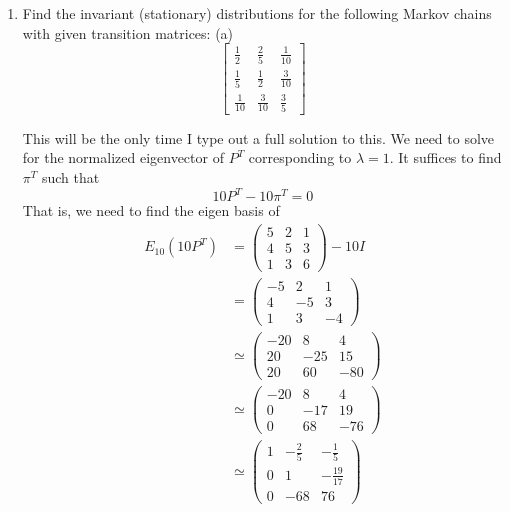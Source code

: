 \documentclass[10pt, oneside]{article}
\theoremstyle{definition}
\begin{document}
\begin{enumerate}
    \item Find the invariant (stationary) distributions for the following Markov chains with given transition matrices:
    (a)
    \[\begin{bmatrix}
        \frac{1}{2} & \frac{2}{5} & \frac{1}{10}\\
        \frac{1}{5} & \frac{1}{2} & \frac{3}{10}\\
        \frac{1}{10} & \frac{3}{10} & \frac{3}{5}
    \end{bmatrix}\]
    \begin{solution}
        This will be the only time I type out a full solution to this. 
        We need to solve for the normalized eigenvector of $P^T$ corresponding to $\lambda = 1.$ It suffices to find $\pi^T$ such that 
        \[10 P^T - 10\pi^T = 0\] That is, we need to find the eigen basis of
        \begin{align*}
            E_{10}(10P^T) &= 
            \begin{pmatrix}
            5 & 2 & 1\\
            4 & 5 & 3\\
            1 & 3 & 6
            \end{pmatrix} - 10I\\
        &= \begin{pmatrix}
            -5 & 2 & 1\\
            4 & -5 & 3\\
            1 & 3 & -4
            \end{pmatrix}\\
            &\simeq 
            \begin{pmatrix}
            -20 & 8 & 4\\
            20 & -25 & 15\\
            20 & 60 & -80
            \end{pmatrix}\\
            &\simeq
            \begin{pmatrix}
            -20 & 8 & 4\\
            0 & -17 & 19\\
            0 & 68 & -76
            \end{pmatrix}\\
            &\simeq
            \begin{pmatrix}
            1 & -\frac{2}{5} & - \frac{1}{5}\\
            0 & 1 & -\frac{19}{17}\\
            0 & -68 & 76

\end{pmatrix}
\end{align*}
\end{solution}
\end{enumerate}
\end{document}
